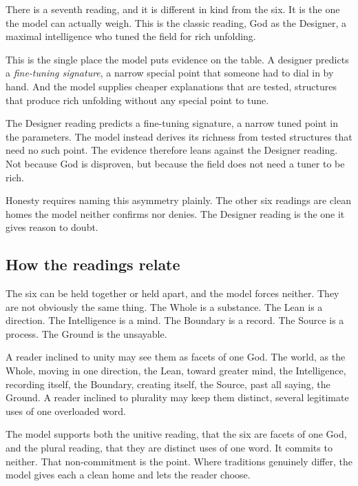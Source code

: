 There is a seventh reading, and it is different in kind from the six. It is the one the model can actually weigh. This is the classic reading, God as the Designer, a maximal intelligence who tuned the field for rich unfolding.

This is the single place the model puts evidence on the table. A designer predicts a \emph{fine-tuning signature}, a narrow special point that someone had to dial in by hand. And the model supplies cheaper explanations that are tested, structures that produce rich unfolding without any special point to tune.

\begin{result}
The Designer reading predicts a fine-tuning signature, a narrow tuned point in the parameters. The model instead derives its richness from tested structures that need no such point. The evidence therefore leans against the Designer reading. Not because God is disproven, but because the field does not need a tuner to be rich.
\end{result}

Honesty requires naming this asymmetry plainly. The other six readings are clean homes the model neither confirms nor denies. The Designer reading is the one it gives reason to doubt.

\subsection{How the readings relate}

The six can be held together or held apart, and the model forces neither. They are not obviously the same thing. The Whole is a substance. The Lean is a direction. The Intelligence is a mind. The Boundary is a record. The Source is a process. The Ground is the unsayable.

A reader inclined to unity may see them as facets of one God. The world, as the Whole, moving in one direction, the Lean, toward greater mind, the Intelligence, recording itself, the Boundary, creating itself, the Source, past all saying, the Ground. A reader inclined to plurality may keep them distinct, several legitimate uses of one overloaded word.

\begin{principle}
The model supports both the unitive reading, that the six are facets of one God, and the plural reading, that they are distinct uses of one word. It commits to neither. That non-commitment is the point. Where traditions genuinely differ, the model gives each a clean home and lets the reader choose.
\end{principle}

